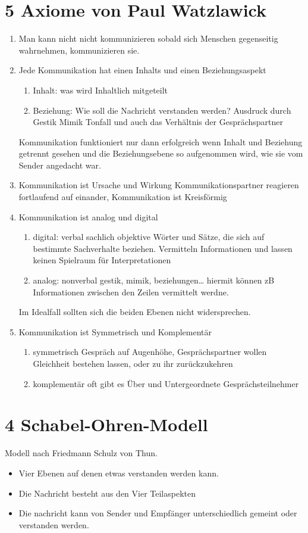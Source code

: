 \documentclass[11pt]{article}
\begin{document}
\section{5 Axiome von Paul Watzlawick}
\label{sec:org68ab5dc}
\begin{enumerate}
\item Man kann nicht nicht kommunizieren
sobald sich Menschen gegenseitig wahrnehmen, kommunizieren sie.
\item Jede Kommunikation hat einen Inhalts und einen Beziehungsaspekt
\begin{enumerate}
\item Inhalt:
was wird Inhaltlich mitgeteilt
\item Beziehung:
Wie soll die Nachricht verstanden werden? Ausdruck durch Gestik Mimik Tonfall und auch das Verhältnis der Gesprächspartner
\end{enumerate}

Kommunikation funktioniert nur dann erfolgreich wenn Inhalt und Beziehung getrennt gesehen und die Beziehungsebene so aufgenommen wird, wie sie vom Sender angedacht war.
\item Kommunikation ist Ursache und Wirkung
Kommunikationspartner reagieren fortlaufend auf einander, Kommunikation ist Kreisförmig
\item Kommunikation ist analog und digital
\begin{enumerate}
\item digital: verbal
sachlich objektive Wörter und Sätze, die sich auf bestimmte Sachverhalte beziehen. Vermitteln Informationen und lassen keinen Spielraum für Interpretationen
\item analog: nonverbal
gestik, mimik, beziehungen\ldots{} hiermit können zB Informationen zwischen den Zeilen vermittelt werdne.
\end{enumerate}

Im Idealfall sollten sich die beiden Ebenen nicht widersprechen.
\item Kommunikation ist Symmetrisch und Komplementär
\begin{enumerate}
\item symmetrisch
Gespräch auf Augenhöhe, Gesprächspartner wollen Gleichheit bestehen lassen, oder zu ihr zurückzukehren
\item komplementär
oft gibt es Über und Untergeordnete Gesprächsteilnehmer
\end{enumerate}
\end{enumerate}
\section{4 Schabel-Ohren-Modell}
\label{sec:orgc76df67}
Modell nach Friedmann Schulz von Thun.
\begin{itemize}
\item Vier Ebenen auf denen etwas verstanden werden kann.
\item Die Nachricht besteht aus den Vier Teilaspekten
\item Die nachricht kann von Sender und Empfänger unterschiedlich gemeint oder verstanden werden.
\end{itemize}
\end{document}
